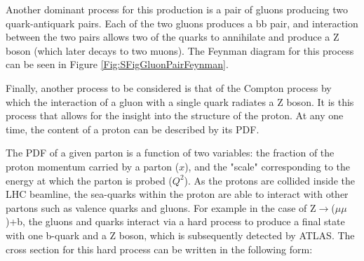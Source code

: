 \documentclass[12pt,a4paper,epsf,portrait,times,epsfig]{article}
\begin{document}

		
		
		Another dominant process for this production is a pair of gluons producing two quark-antiquark pairs. Each of the two gluons produces a bb pair, and interaction between the two pairs allows two of the quarks to annihilate and produce a Z boson (which later decays to two muons). The Feynman diagram for this process can be seen in Figure \ref{Fig:SFigGluonPairFeynman}. \par
		
		Finally, another process to be considered is that of the Compton process by which the interaction of a gluon with a single quark radiates a Z boson. It is this process that allows for the insight into the structure of the proton. At any one time, the content of a proton can be described by its PDF. \par
		
		The PDF of a given parton is a function of two variables: the fraction of the proton momentum carried by a parton ($x$), and the "scale" corresponding to the energy at which the parton is probed ($Q^{2}$). As the protons are collided inside the LHC beamline, the sea-quarks within the proton are able to interact with other partons such as valence quarks and gluons. For example in the case of Z$\rightarrow$($\mu\mu$)+b, the gluons and quarks interact via a hard process to produce a final state with one b-quark and a Z boson, which is subsequently detected by ATLAS. The cross section for this hard process can be written in the following form:
		

		
\end{document}
